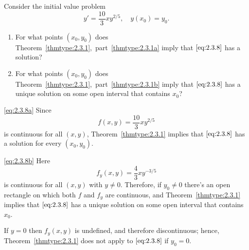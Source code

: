 \documentclass{ximera}
\begin{document}
\begin{example}\label{example:2.3.5}
Consider the initial value problem
\begin{equation} \label{eq:2.3.8}
y' = \frac{10}{3}xy^{2/5}, \quad y(x_0) = y_0.
\end{equation}
\begin{enumerate}
\item\label{eq:2.3.8a}
For what points $(x_0,y_0)$ does Theorem~\ref{thmtype:2.3.1},~part~\ref{thmtype:2.3.1a}
imply that
$\eqref{eq:2.3.8}$ has a solution?

\item\label{eq:2.3.8b}
For what points $(x_0,y_0)$ does Theorem~\ref{thmtype:2.3.1},~part~\ref{thmtype:2.3.1b}
imply that
$\eqref{eq:2.3.8}$ has a unique solution on some open interval that contains
$x_0$?
\end{enumerate}

\begin{explanation}
\ref{eq:2.3.8a} Since
$$
f(x,y) = \frac{10}{3}xy^{2/5}
$$
is continuous for all $(x,y)$,  Theorem~\ref{thmtype:2.3.1}
implies that $\eqref{eq:2.3.8}$ has a solution for every $(x_0,y_0)$.

\ref{eq:2.3.8b} Here
$$
f_y(x,y) = \frac{4}{3}xy^{-3/5}
$$
is continuous for all $(x,y)$ with $y\neq 0$. Therefore, if $y_0\neq0$
there's an open rectangle on which both $f$ and $f_y$ are
continuous, and Theorem~\ref{thmtype:2.3.1} implies that $\eqref{eq:2.3.8}$ has
a unique solution on some open interval that contains $x_0$.

If $y=0$ then $f_y(x,y)$ is undefined, and therefore discontinuous;
hence, Theorem~\ref{thmtype:2.3.1} does not apply to $\eqref{eq:2.3.8}$ if
$y_0=0$.
\end{explanation}
\end{example}
\end{document}
